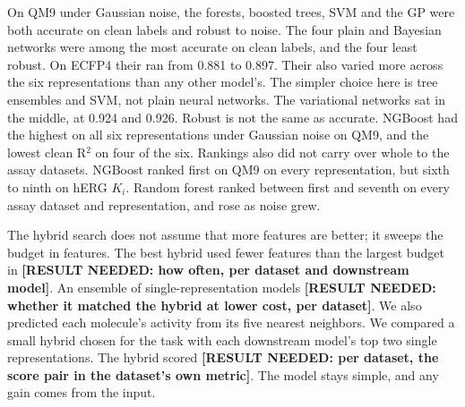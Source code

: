 On QM9 under Gaussian noise, the forests, boosted trees, SVM and the GP were both accurate on clean labels and robust to noise. The four plain and Bayesian networks were among the most accurate on clean labels, and the four least robust. On ECFP4 their \aucnorm{} ran from 0.881 to 0.897. Their \aucnorm{} also varied more across the six representations than any other model's. The simpler choice here is tree ensembles and SVM, not plain neural networks. The variational networks sat in the middle, at \aucnorm{} 0.924 and 0.926. Robust is not the same as accurate. NGBoost had the highest \aucnorm{} on all six representations under Gaussian noise on QM9, and the lowest clean R$^2$ on four of the six. Rankings also did not carry over whole to the assay datasets. NGBoost ranked first on QM9 on every representation, but sixth to ninth on hERG $K_i$. Random forest ranked between first and seventh on every assay dataset and representation, and rose as noise grew.

The hybrid search does not assume that more features are better; it sweeps the budget in features. The best hybrid used fewer features than the largest budget in \textbf{[RESULT NEEDED: how often, per dataset and downstream model]}. An ensemble of single-representation models \textbf{[RESULT NEEDED: whether it matched the hybrid at lower cost, per dataset]}. We also predicted each molecule's activity from its five nearest neighbors. We compared a small hybrid chosen for the task with each downstream model's top two single representations. The hybrid scored \textbf{[RESULT NEEDED: per dataset, the score pair in the dataset's own metric]}. The model stays simple, and any gain comes from the input.


